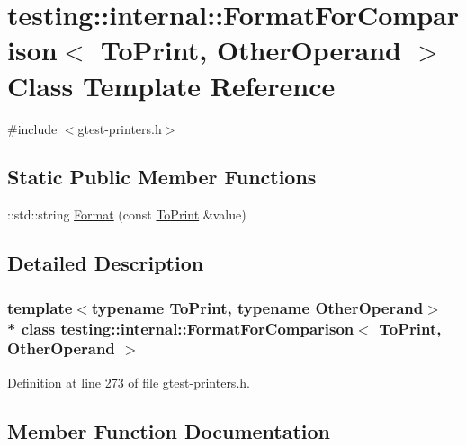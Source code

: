 \hypertarget{classtesting_1_1internal_1_1_format_for_comparison}{}\section{testing\+:\+:internal\+:\+:Format\+For\+Comparison$<$ To\+Print, Other\+Operand $>$ Class Template Reference}
\label{classtesting_1_1internal_1_1_format_for_comparison}


{\ttfamily \#include $<$gtest-\/printers.\+h$>$}

\subsection*{Static Public Member Functions}
\begin{DoxyCompactItemize}
\item 
\+::std\+::string \hyperlink{classtesting_1_1internal_1_1_format_for_comparison_a2aeb688fc55b57abd3021d82eccad896}{Format} (const \hyperlink{classes__6_8js_ad81a47989c7025eaa75cb3cd6c05ca66}{To\+Print} \&value)
\end{DoxyCompactItemize}


\subsection{Detailed Description}
\subsubsection*{template$<$typename To\+Print, typename Other\+Operand$>$\\*
class testing\+::internal\+::\+Format\+For\+Comparison$<$ To\+Print, Other\+Operand $>$}



Definition at line 273 of file gtest-\/printers.\+h.



\subsection{Member Function Documentation}
